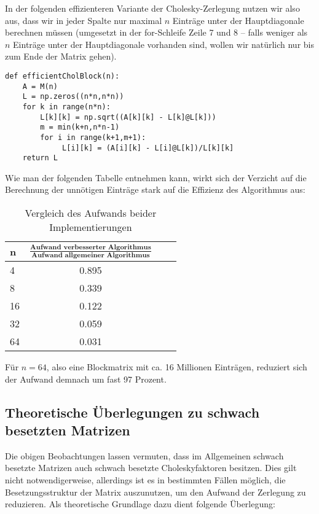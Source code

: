 In der folgenden effizienteren Variante der Cholesky-Zerlegung nutzen wir also aus, dass wir in jeder Spalte nur maximal $n$ Einträge unter der Hauptdiagonale berechnen müssen (umgesetzt in der for-Schleife Zeile 7 und 8 -- falls weniger als $n$ Einträge unter der Hauptdiagonale vorhanden sind, wollen wir natürlich nur bis zum Ende der Matrix gehen).

\lstset{language=Python}
\lstset{frame=lines}
\lstset{basicstyle=\footnotesize}
\begin{lstlisting}
def efficientCholBlock(n):
    A = M(n)
    L = np.zeros((n*n,n*n))
    for k in range(n*n):
        L[k][k] = np.sqrt((A[k][k] - L[k]@L[k]))
        m = min(k+n,n*n-1)
        for i in range(k+1,m+1):
             L[i][k] = (A[i][k] - L[i]@L[k])/L[k][k]
    return L
\end{lstlisting}

Wie man der folgenden Tabelle entnehmen kann, wirkt sich der Verzicht auf die Berechnung der unnötigen Einträge stark auf die Effizienz des Algorithmus aus:


\begin{table}[htb]
\centering
\caption{Vergleich des Aufwands beider Implementierungen}
\begin{tabular}{lccc}
\toprule
\textbf{n}
&\textbf{$\frac{\mathrm{\textbf{Aufwand verbesserter Algorithmus}}}{\mathrm{\textbf{Aufwand allgemeiner Algorithmus}}}$}  & \\
	        \midrule
4 & 0.895 \\
8 & 0.339 \\
16& 0.122 \\
32& 0.059 \\
64& 0.031 \\
\end{tabular}
\end{table}

Für $n=64$, also eine Blockmatrix mit ca. 16 Millionen Einträgen, reduziert sich der Aufwand demnach um fast 97 Prozent.

\subsection{Theoretische Überlegungen zu schwach besetzten Matrizen}

Die obigen Beobachtungen lassen vermuten, dass im Allgemeinen schwach besetzte Matrizen auch schwach besetzte Choleskyfaktoren besitzen. Dies gilt nicht notwendigerweise, allerdings ist es in bestimmten Fällen möglich, die Besetzungsstruktur der Matrix auszunutzen, um den Aufwand der Zerlegung zu reduzieren. Als theoretische Grundlage dazu dient folgende Überlegung:


